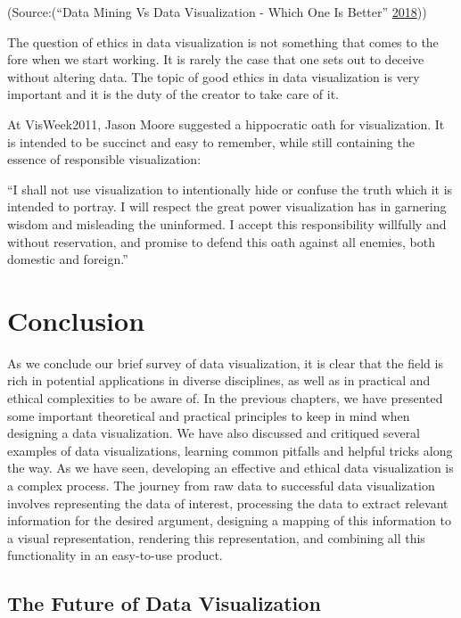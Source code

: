 \documentclass[]{book}
\theoremstyle{definition}
\theoremstyle{definition}
\theoremstyle{definition}
\theoremstyle{remark}
\begin{document}
(Source:(``Data Mining Vs Data Visualization - Which One Is Better''
\protect\hyperlink{ref-datamining_vs_viz}{2018}))

The question of ethics in data visualization is not something that comes
to the fore when we start working. It is rarely the case that one sets
out to deceive without altering data. The topic of good ethics in data
visualization is very important and it is the duty of the creator to
take care of it.

At VisWeek2011, Jason Moore suggested a hippocratic oath for
visualization. It is intended to be succinct and easy to remember, while
still containing the essence of responsible visualization:

``I shall not use visualization to intentionally hide or confuse the
truth which it is intended to portray. I will respect the great power
visualization has in garnering wisdom and misleading the uninformed. I
accept this responsibility willfully and without reservation, and
promise to defend this oath against all enemies, both domestic and
foreign.''

\chapter{Conclusion}\label{conclusion}

As we conclude our brief survey of data visualization, it is clear that
the field is rich in potential applications in diverse disciplines, as
well as in practical and ethical complexities to be aware of. In the
previous chapters, we have presented some important theoretical and
practical principles to keep in mind when designing a data
visualization. We have also discussed and critiqued several examples of
data visualizations, learning common pitfalls and helpful tricks along
the way. As we have seen, developing an effective and ethical data
visualization is a complex process. The journey from raw data to
successful data visualization involves representing the data of
interest, processing the data to extract relevant information for the
desired argument, designing a mapping of this information to a visual
representation, rendering this representation, and combining all this
functionality in an easy-to-use product.

\section{The Future of Data
Visualization}\label{the-future-of-data-visualization}
\end{document}
